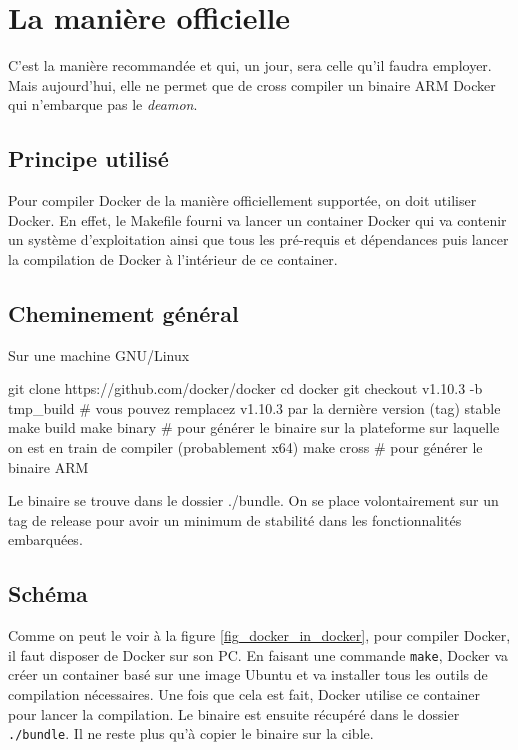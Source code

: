 \documentclass[11pt,a4paper,oneside]{report}
\newcommand{\code}[1]{\texttt{#1}} %
\begin{document}
\section{La manière officielle}\label{maniere_officielle}

C'est la manière recommandée et qui, un jour, sera celle qu'il faudra
employer. Mais aujourd'hui, elle ne permet que de cross compiler un
binaire ARM Docker qui n'embarque pas le \emph{deamon}.

\subsection{Principe utilisé}

Pour compiler Docker de la manière officiellement supportée, on doit utiliser Docker. En effet, le Makefile fourni va lancer un container Docker qui va contenir un système d'exploitation ainsi que tous les pré-requis et dépendances puis lancer la compilation de Docker à l'intérieur de ce container.

\subsection{Cheminement général}

Sur une machine GNU/Linux

\begin{bashcode}
git clone https://github.com/docker/docker
cd docker
git checkout v1.10.3 -b tmp_build # vous pouvez remplacez v1.10.3 par la dernière version (tag) stable
make build
make binary # pour générer le binaire sur la plateforme sur laquelle on est en train de compiler (probablement x64)
make cross # pour générer le binaire ARM
\end{bashcode}

Le binaire se trouve dans le dossier ./bundle. On se place volontairement sur un tag de release pour avoir un minimum de stabilité dans les fonctionnalités embarquées.

\subsection{Schéma}

Comme on peut le voir à la figure \ref{fig_docker_in_docker}, pour compiler Docker, il faut disposer de Docker sur son PC. En faisant une commande \code{make}, Docker va créer un container basé sur une image Ubuntu et va installer tous les outils de compilation nécessaires. Une fois que cela est fait, Docker utilise ce container pour lancer la compilation. Le binaire est ensuite récupéré dans le dossier \code{./bundle}. Il ne reste plus qu'à copier le binaire sur la cible.
\end{document}
